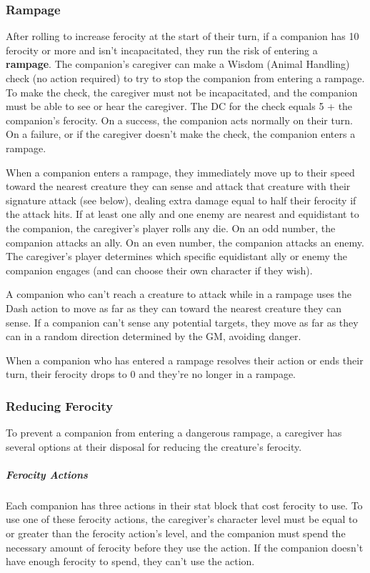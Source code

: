 \documentclass[10pt,a4paper,twoside,bg=print,twocolumn,openany,nodeprecatedcode]{dndbook}
\begin{document}
\subsubsection{Rampage}
After rolling to increase ferocity at the start of their turn, if a companion has 10 ferocity or more and isn't incapacitated, they run the risk of entering a \textbf{rampage}. The companion's caregiver can make a Wisdom (Animal Handling) check (no action required) to try to stop the companion from entering a rampage. To make the check, the caregiver must not be incapacitated, and the companion must be able to see or hear the caregiver. The DC for the check equals 5 + the companion's ferocity. On a success, the companion acts normally on their turn. On a failure, or if the caregiver doesn't make the check, the companion enters a rampage.

When a companion enters a rampage, they immediately move up to their speed toward the nearest creature they can sense and attack that creature with their signature attack (see below), dealing extra damage equal to half their ferocity if the attack hits. If at least one ally and one enemy are nearest and equidistant to the companion, the caregiver's player rolls any die. On an odd number, the companion attacks an ally. On an even number, the companion attacks an enemy. The caregiver's player determines which specific equidistant ally or enemy the companion engages (and can choose their own character if they wish).

A companion who can't reach a creature to attack while in a rampage uses the Dash action to move as far as they can toward the nearest creature they can sense. If a companion can't sense any potential targets, they move as far as they can in a random direction determined by the GM, avoiding danger.

When a companion who has entered a rampage resolves their action or ends their turn, their ferocity drops to 0 and they're no longer in a rampage.

\subsubsection{Reducing Ferocity}
To prevent a companion from entering a dangerous rampage, a caregiver has several options at their disposal for reducing the creature's ferocity.

\subparagraph{Ferocity Actions}
Each companion has three actions in their stat block that cost ferocity to use. To use one of these ferocity actions, the caregiver's character level must be equal to or greater than the ferocity action's level, and the companion must spend the necessary amount of ferocity before they use the action. If the companion doesn't have enough ferocity to spend, they can't use the action.
\end{document}
